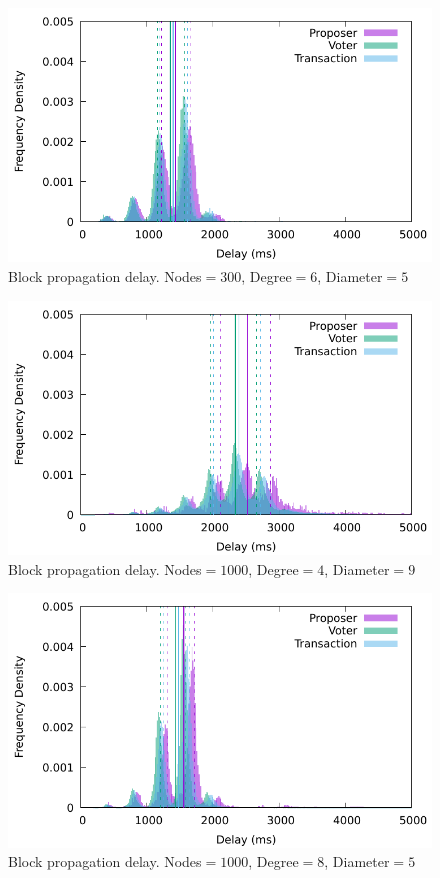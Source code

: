  \begin{figure}[t]
   \centering
   \includegraphics[width=0.8\linewidth]{figures/delay300nodes6.pdf}
   \caption{Block propagation delay. Nodes$=300$, Degree$=6$, Diameter$=5$}%
   \label{fig:propagation3}
 \end{figure}
 
 \begin{figure}[t]
   \centering
   \includegraphics[width=0.8\linewidth]{figures/delay1000nodes4.pdf}
   \caption{Block propagation delay. Nodes$=1000$, Degree$=4$, Diameter$=9$}%
   \label{fig:propagation4}
 \end{figure}
 
 \begin{figure}[t]
   \centering
   \includegraphics[width=0.8\linewidth]{figures/delay1000nodes8.pdf}
   \caption{Block propagation delay. Nodes$=1000$, Degree$=8$, Diameter$=5$}
   \label{fig:propagation5}
 \end{figure}
 

